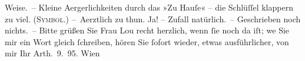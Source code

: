 \begin{ledgroupsized}[t]{13cm}
               Weise. – Kleine Aergerlichkeiten durch das »Zu Hauſe« – die Schlüſſel {\pb}klappern zu viel. (\textsc{Symbol}.)\pend
           \pstart
           – Aerztlich zu thun. Ja! – Zufall natürlich. –\pend
           \pstart
           Geschrieben noch nichts. –\pend
           \pstart
           Bitte grüßen Sie Frau Lou recht herzlich, wenn
               ſie noch da iſt; we{\geminationn} Sie mir ein Wort gleich ſchreiben,
                  {\pb}hören Sie ſofort wieder, etwas ausführlicher, von
               mir\pend
           \pstart Ihr \spacefill\mbox{Arth}\pend{}. 9. 95. Wien\pend
           
         
         \endnumbering{}\end{ledgroupsized}  \newcommand{\dateiname}{L00481}\newcommand{\titel}{Arthur Schnitzler an Richard Beer-Hofmann, 12. 9. 1895}\newcommand{\editorInnen}{Martin Anton Müller und Gerd-Hermann Susen}
      